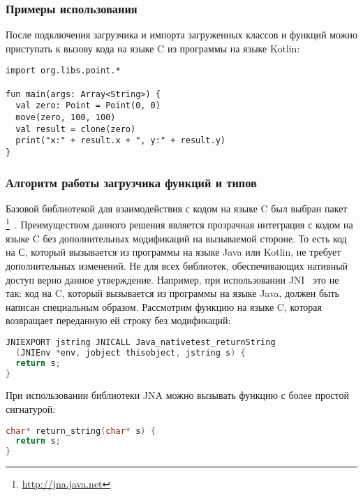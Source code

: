 \begin{code}
\subsubsection{Примеры использования}
После подключения загрузчика и импорта загруженных классов и функций можно приступать к вызову кода на языке C из программы на языке Kotlin:
\begin{lstlisting}[caption={Пример работы с функциями и структурами данных, загруженных из заголовочного файла~\ref{point-h-example}.}, label=point-example]
import org.libs.point.*

fun main(args: Array<String>) {
  val zero: Point = Point(0, 0)
  move(zero, 100, 100)
  val result = clone(zero)
  print("x:" + result.x + ", y:" + result.y)
}
\end{lstlisting}\end{code}
\subsubsection{Алгоритм работы загрузчика функций и типов}

Базовой библиотекой для взаимодействия с кодом на языке C был выбран пакет \footnote{\url{http://jna.java.net}}~\cite{jna-book}.
Преимуществом данного решения является прозрачная интеграция с кодом на языке C без дополнительных модификаций на вызываемой стороне.
То есть код на С, который вызывается из программы на языке Java или Kotlin, не требует дополнительных изменений.
Не для всех библиотек, обеспечивающих нативный доступ верно данное утверждение.
Например, при использовании JNI~\cite{jni-spec} это не так: код на C, который вызывается из программы на языке Java, должен быть написан специальным образом.
Рассмотрим функцию на языке C, которая возвращает переданную ей строку без модификаций:

\begin{code}\begin{lstlisting}[language=C, caption={Пример функции на языке C, которая доступна для вызова через библиотеку JNI.}, label=jni-example]
JNIEXPORT jstring JNICALL Java_nativetest_returnString
  (JNIEnv *env, jobject thisobject, jstring s) {
  return s;
}
\end{lstlisting}\end{code}

\begin{code}
При использовании библиотеки JNA можно вызывать функцию с более простой сигнатурой:
\begin{lstlisting}[language=C, caption={Пример функции на языке C, аналогичной функции из примера~\ref{jni-example}, которая доступна для вызова через библиотеку JNA.}, label=jna-example]
char* return_string(char* s) {
  return s;
}
\end{lstlisting}\end{code}

